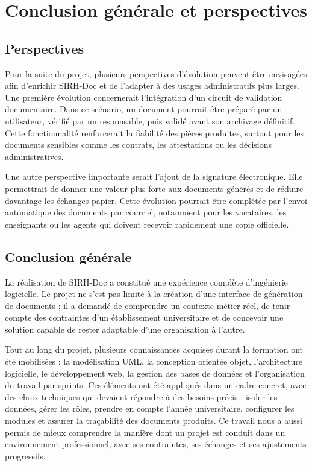 \chapter*{Conclusion générale et perspectives}

\section*{Perspectives}

Pour la suite du projet, plusieurs perspectives d'évolution peuvent être envisagées afin d'enrichir SIRH-Doc et de l'adapter à des usages administratifs plus larges. Une première évolution concernerait l'intégration d'un circuit de validation documentaire. Dans ce scénario, un document pourrait être préparé par un utilisateur, vérifié par un responsable, puis validé avant son archivage définitif. Cette fonctionnalité renforcerait la fiabilité des pièces produites, surtout pour les documents sensibles comme les contrats, les attestations ou les décisions administratives.

Une autre perspective importante serait l'ajout de la signature électronique. Elle permettrait de donner une valeur plus forte aux documents générés et de réduire davantage les échanges papier. Cette évolution pourrait être complétée par l'envoi automatique des documents par courriel, notamment pour les vacataires, les enseignants ou les agents qui doivent recevoir rapidement une copie officielle.


\section*{Conclusion générale}

La réalisation de SIRH-Doc a constitué une expérience complète d'ingénierie logicielle. Le projet ne s'est pas limité à la création d'une interface de génération de documents ; il a demandé de comprendre un contexte métier réel, de tenir compte des contraintes d'un établissement universitaire et de concevoir une solution capable de rester adaptable d'une organisation à l'autre.

Tout au long du projet, plusieurs connaissances acquises durant la formation ont été mobilisées : la modélisation UML, la conception orientée objet, l'architecture logicielle, le développement web, la gestion des bases de données et l'organisation du travail par sprints. Ces éléments ont été appliqués dans un cadre concret, avec des choix techniques qui devaient répondre à des besoins précis : isoler les données, gérer les rôles, prendre en compte l'année universitaire, configurer les modules et assurer la traçabilité des documents produits. Ce travail nous a aussi permis de mieux comprendre la manière dont un projet est conduit dans un environnement professionnel, avec ses contraintes, ses échanges et ses ajustements progressifs.

